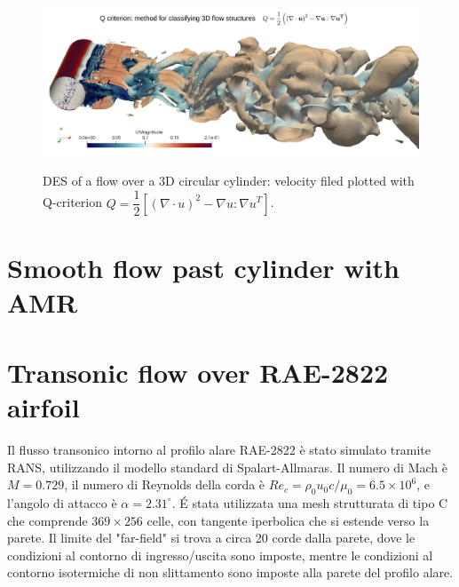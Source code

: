 \documentclass[a5paper]{sapthesis}
\begin{document}
	\begin{figure}
		\begin{center}
			{\includegraphics[width=0.98\linewidth]{Figures/Des_cylinder}}
			\caption[Velocity representation through Q-criterion of a DES of the circular cylinder]{DES of a flow over a 3D circular cylinder: velocity filed plotted with Q-criterion $Q = \dfrac{1}{2} [(\nabla \cdot u)^2 - \nabla u : \nabla u^T]$.}
			\label{Des_Cylinder}
		\end{center}
	\end{figure}
	
	\section{Smooth flow past cylinder with AMR}
	\label{AMR_cylinder}
	
	\section{Transonic flow over RAE-2822 airfoil}
	Il flusso transonico intorno al profilo alare RAE-2822 è stato simulato tramite RANS, utilizzando il modello standard di Spalart-Allmaras. Il numero di Mach è $M = 0.729$, il numero di Reynolds della corda è $Re_c = \rho_0 u_0 c /\mu_0 = 6.5 \times 10^6$, e l'angolo di attacco è $\alpha = 2.31^\circ$. \'E stata utilizzata una mesh strutturata di tipo C che comprende $369 \times 256$ celle, con tangente iperbolica che si estende verso la parete. Il limite del "far-field" si trova a circa 20 corde dalla parete, dove le condizioni al contorno di ingresso/uscita sono imposte, mentre le condizioni al contorno isotermiche di non slittamento sono imposte alla parete del profilo alare.
	
\end{document}
